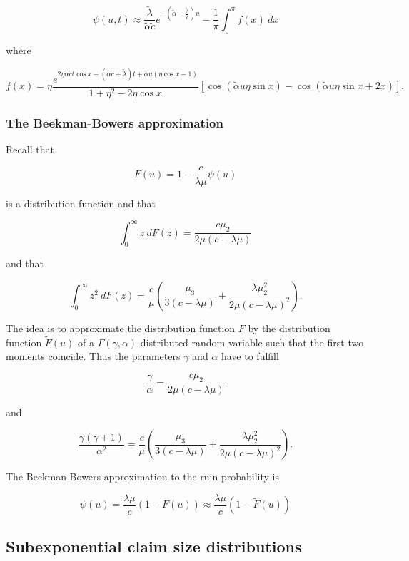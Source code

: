 \documentclass[a4paper,12pt,openany]{book}
\begin{document}
\[
\psi(u,t)\approx \frac{\tilde \lambda}{\tilde\alpha\tilde c}e^{-\left(\tilde\alpha-\frac{\tilde \lambda}{\tilde c}\right)u}-\frac{1}{\pi}\int_0^\pi f(x)\ dx
\]

where

\[
f(x)=\eta\frac{e^{2\eta\tilde\alpha\tilde c t \cos x-(\tilde\alpha\tilde c + \tilde \lambda)t+\tilde\alpha u(\eta \cos x - 1)}}{1+\eta^2-2\eta \cos x}[\cos(\tilde\alpha u\eta\sin x)-\cos(\tilde \alpha u \eta \sin x + 2x)].
\]

\hypertarget{the-beekman-bowers-approximation}{%
\subsubsection{The Beekman-Bowers approximation}\label{the-beekman-bowers-approximation}}

Recall that

\[
F(u)=1-\frac{c}{\lambda \mu}\psi(u)
\]

is a distribution function and that

\[
\int_0^\infty z\ dF(z)=\frac{c\mu_2}{2\mu(c-\lambda\mu)}
\]

and that

\[
\int_0^\infty z^2\ dF(z)=\frac{c}{\mu}\left(\frac{\mu_3}{3(c-\lambda\mu)}+\frac{\lambda\mu_2^2}{2\mu(c-\lambda\mu)^2}\right).
\]

The idea is to approximate the distribution function \(F\) by the distribution function \(\tilde F(u)\) of a \(\Gamma(\gamma,\alpha)\) distributed random variable such that the first two moments coincide. Thus the parameters \(\gamma\) and \(\alpha\) have to fulfill

\[
\frac{\gamma}{\alpha}=\frac{c\mu_2}{2\mu(c-\lambda \mu)}
\]

and

\[
\frac{\gamma(\gamma +1)}{\alpha^2}=\frac{c}{\mu}\left(\frac{\mu_3}{3(c-\lambda\mu)}+\frac{\lambda\mu_2^2}{2\mu(c-\lambda\mu)^2}\right).
\]

The Beekman-Bowers approximation to the ruin probability is

\[
\psi(u)=\frac{\lambda \mu}{c}(1-F(u))\approx \frac{\lambda\mu}{c}(1-\tilde F(u))
\]

\hypertarget{subexponential-claim-size-distributions}{%
\subsection{Subexponential claim size distributions}\label{subexponential-claim-size-distributions}}
\end{document}

